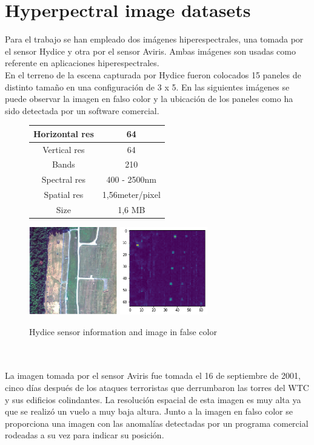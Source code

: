 \section{Hyperpectral image datasets}
Para el trabajo se han empleado dos imágenes hiperespectrales, una tomada por el sensor Hydice y otra por el sensor Aviris. Ambas imágenes son usadas como referente en aplicaciones hiperespectrales. 
\\
En el terreno de la escena capturada por Hydice fueron colocados 15 paneles de distinto tamaño en una configuración de 3 x 5. En las siguientes imágenes se puede observar la imagen en falso color y la ubicación de los paneles como ha sido detectada por un software comercial.
\begin{figure}[!ht]
    \begin{tabular}[b]{c|c}\hline
      Horizontal res & 64 \\ \hline
      Vertical res & 64 \\ \hline
      Bands & 210 \\ \hline
      Spectral res & 400 - 2500nm \\ \hline
      Spatial res & 1,56meter/pixel \\ \hline
      Size & 1,6 MB\\ \hline
    \end{tabular}
\includegraphics[height=1.5in]{figures/hydice_bad.png}
\includegraphics[height=1.5in]{figures/hydice_rx.png}
    \caption{Hydice sensor information and image in false color}
  \end{figure}
\\
\\
La imagen tomada por el sensor Aviris fue tomada el 16 de septiembre de 2001, cinco días después de los ataques terroristas que derrumbaron las torres del WTC y sus edificios colindantes. La resolución espacial de esta imagen es muy alta ya que se realizó un vuelo a muy baja altura. Junto a la imagen en falso color se proporciona una imagen con las anomalías detectadas por un programa comercial rodeadas a su vez para indicar su posición.
